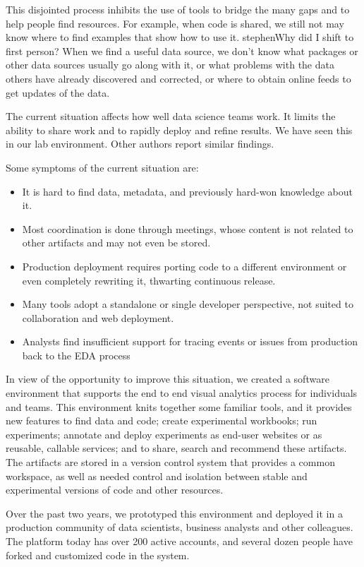 This disjointed process inhibits the use of tools to bridge
the many gaps and to help people find resources.
For example, when code is shared, we still not may know where to find examples
that show how to use it. stephen{Why did I shift to first person?}
When we find a useful data source, we don't know what packages or
other data sources usually go along with it, or what problems with the data
others have already discovered and corrected, or where to obtain online feeds
to get updates of the data.

The current situation affects how well data science teams work. It limits
the ability to share work and to rapidly deploy and refine results.
We have seen this in our lab environment.
Other authors report similar findings.

Some symptoms of the current situation are:
\begin{itemize}
\item It is hard to find data, metadata, and previously hard-won knowledge about it.
\item Most coordination is done through meetings, whose content is not related to other artifacts and may not even be stored.
\item Production deployment requires porting code to a different environment or even completely rewriting it, thwarting continuous release.
\item Many tools adopt a standalone or single developer perspective,
not suited to collaboration and web deployment. 
\item Analysts find insufficient support for tracing events or issues from production back to the EDA process
\end{itemize}

In view of the opportunity to improve this situation,
we created a software environment that supports the end to end
visual analytics process for individuals and teams.
This environment knits together some familiar tools, and it
provides new features to find data and code; create experimental workbooks;
run experiments; annotate and deploy experiments as end-user websites or
as reusable, callable services; and to share, search and recommend these artifacts. The artifacts are stored in a version
control system that provides a common workspace, as well as needed control
and isolation between stable and experimental versions of code and other
resources. 

Over the past two years, we prototyped this environment and deployed it
in a production community of data scientists, business analysts and other colleagues.
The platform today has over 200 active accounts, and several dozen people have forked
and customized code in the system.

